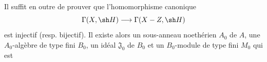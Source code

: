Il suffit en outre de prouver que l'homomorphisme canonique
\[
  \Gamma(X,\sh H)\longrightarrow\Gamma(X-Z,\sh H)
\]
est injectif (resp. bijectif). Il existe alors un sous-anneau noethérien $A_0$ de $A$, une $A_0$-algèbre de type fini $B_0$, un idéal $\mathfrak J_0$ de $B_0$ et un $B_0$-module de type fini $M_0$ qui est

